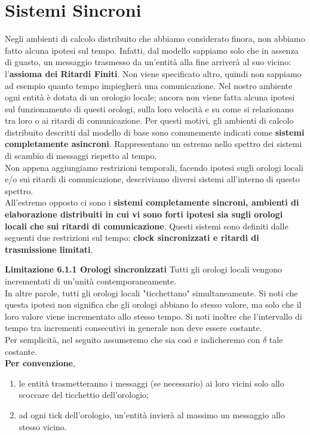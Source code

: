 \chapter{Sistemi Sincroni}
Negli ambienti di calcolo distribuito che abbiamo considerato finora, non abbiamo fatto alcuna ipotesi sul tempo. Infatti, dal modello sappiamo solo che in assenza di guasto, un messaggio trasmesso da un'entità alla fine arriverà al suo vicino: l'\textbf{assioma dei Ritardi Finiti}. Non viene specificato altro, quindi non sappiamo ad esempio quanto tempo impiegherà una comunicazione. Nel nostro ambiente ogni entità è dotata di un orologio locale; ancora non viene fatta alcuna ipotesi sul funzionamento di questi orologi, sulla loro velocità e su come si relazionano tra loro o ai ritardi di comunicazione. Per questi motivi, gli ambienti di calcolo distribuito descritti dal modello di base sono comunemente indicati come \textbf{sistemi completamente asincroni}. Rappresentano un estremo nello spettro dei sistemi di scambio di messaggi rispetto al tempo.\\
Non appena aggiungiamo restrizioni temporali, facendo ipotesi sugli orologi locali e/o sui ritardi di comunicazione, descriviamo diversi sistemi all'interno di questo spettro.\\
All'estremo opposto ci sono i \textbf{sistemi completamente sincroni, ambienti di elaborazione distribuiti in cui vi sono forti ipotesi sia sugli orologi locali che sui ritardi di comunicazione}. Questi sistemi sono definiti dalle seguenti due restrizioni sul tempo: \textbf{clock sincronizzati e ritardi di trasmissione limitati}.

\textbf{Limitazione 6.1.1 Orologi sincronizzati} Tutti gli orologi locali vengono incrementati di un'unità contemporaneamente.\\
In altre parole, tutti gli orologi locali "ticchettano" simultaneamente. Si noti che questa ipotesi non significa che gli orologi abbiano lo stesso valore, ma solo che il loro valore viene incrementato allo stesso tempo. Si noti inoltre che l'intervallo di tempo tra incrementi consecutivi in generale non deve essere costante.\\
Per semplicità, nel seguito assumeremo che sia così e indicheremo con $\delta$ tale costante.\\

\textbf{Per convenzione},
\begin{enumerate}
    \item le entità trasmetteranno i messaggi (se necessario) ai loro vicini solo allo scoccare del ticchettio dell'orologio;
    \item ad ogni tick dell'orologio, un'entità invierà al massimo un messaggio allo stesso vicino.
\end{enumerate}

